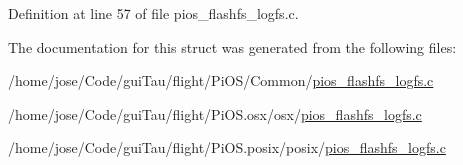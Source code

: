 Definition at line 57 of file pios\-\_\-flashfs\-\_\-logfs.\-c.



The documentation for this struct was generated from the following files\-:\begin{DoxyCompactItemize}
\item 
/home/jose/\-Code/gui\-Tau/flight/\-Pi\-O\-S/\-Common/\hyperlink{_common_2pios__flashfs__logfs_8c}{pios\-\_\-flashfs\-\_\-logfs.\-c}\item 
/home/jose/\-Code/gui\-Tau/flight/\-Pi\-O\-S.\-osx/osx/\hyperlink{osx_2osx_2pios__flashfs__logfs_8c}{pios\-\_\-flashfs\-\_\-logfs.\-c}\item 
/home/jose/\-Code/gui\-Tau/flight/\-Pi\-O\-S.\-posix/posix/\hyperlink{posix_2posix_2pios__flashfs__logfs_8c}{pios\-\_\-flashfs\-\_\-logfs.\-c}\end{DoxyCompactItemize}
